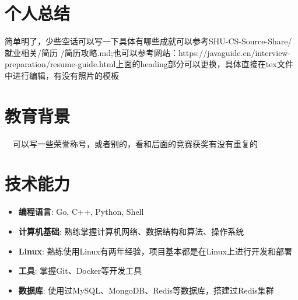 \documentclass{resume}
\begin{document}



\section{个人总结}
简单明了，少些空话可以写一下具体有哪些成就可以参考SHU-CS-Source-Share/就业相关/简历
/简历攻略.md;也可以参考网站：https://javaguide.cn/interview-preparation/resume-guide.html上面的heading部分可以更换，具体直接在tex文件中进行编辑，有没有照片的模板

\section{教育背景}
\ \ 可以写一些荣誉称号，或者别的，看和后面的竞赛获奖有没有重复的

\section{技术能力}
\begin{itemize}[parsep=0.5ex]
  \item \textbf{编程语言}: Go, C++, Python, Shell
  \item \textbf{计算机基础}: 熟练掌握计算机网络、数据结构和算法、操作系统
  \item \textbf{Linux}: 熟练使用Linux有两年经验，项目基本都是在Linux上进行开发和部署
  \item \textbf{工具}: 掌握Git、Docker等开发工具
  \item \textbf{数据库}: 使用过MySQL、MongoDB、Redis等数据库，搭建过Redis集群
\end{itemize}
\end{document}
